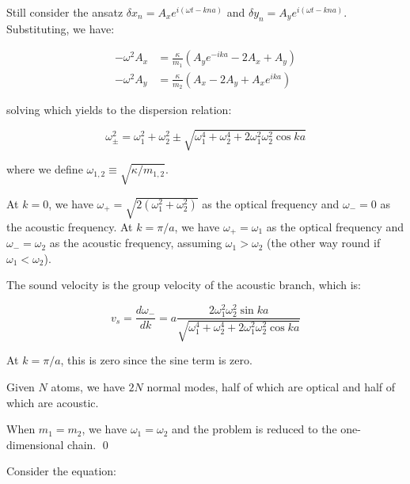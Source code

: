 \documentclass[12pt]{article}
\begin{document}
Still consider the ansatz $\delta x_{n} = A_{x} e^{i(\omega t - kna)}$ and $\delta y_{n} = A_{y} e^{i(\omega t - kna)}$. Substituting, we have:

\begin{equation}
    \begin{split}
        -\omega^{2} A_{x} &= \frac{\kappa}{m_{1}} \left( A_{y} e^{-ika} - 2A_{x} + A_{y} \right) \\
        -\omega^{2} A_{y} &= \frac{\kappa}{m_{2}} \left( A_{x} - 2A_{y} + A_{x} e^{ika} \right)
    \end{split}
\end{equation}

solving which yields to the dispersion relation:

\begin{equation}
    \omega_{\pm}^{2} = \omega_{1}^{2} + \omega_{2}^{2} \pm \sqrt{\omega_{1}^{4} + \omega_{2}^{4} + 2\omega_{1}^{2}\omega_{2}^{2} \cos{ka}}
\end{equation}

where we define $\omega_{1, 2} \equiv \sqrt{\kappa / m_{1, 2}}$.

At $k = 0$, we have $\omega_{+} = \sqrt{2(\omega_{1}^{2} + \omega_{2}^{2})}$ as the optical frequency and $\omega_{-} = 0$ as the acoustic frequency. At $k = \pi/a$, we have $\omega_{+} = \omega_{1}$ as the optical frequency and $\omega_{-} = \omega_{2}$ as the acoustic frequency, assuming $\omega_{1} > \omega_{2}$ (the other way round if $\omega_{1} < \omega_{2}$).

The sound velocity is the group velocity of the acoustic branch, which is:

\begin{equation}
    v_{s} = \frac{d\omega_{-}}{dk} = a \frac{2\omega_{1}^{2}\omega_{2}^{2} \sin{ka}}{\sqrt{\omega_{1}^{4} + \omega_{2}^{4} + 2\omega_{1}^{2}\omega_{2}^{2} \cos{ka}}}
\end{equation}

At $k = \pi/a$, this is zero since the sine term is zero.

Given $N$ atoms, we have $2N$ normal modes, half of which are optical and half of which are acoustic.

When $m_{1} = m_{2}$, we have $\omega_{1} = \omega_{2}$ and the problem is reduced to the one-dimensional chain.
\qed




Consider the equation:
\end{document}
